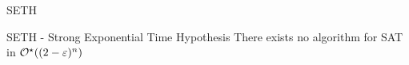 \begin{frame}{SETH}
    \begin{alertblock}{SETH - Strong Exponential Time Hypothesis}
        There exists no algorithm for SAT in $\mathcal{O}^\star((2-\varepsilon)^n)$
    \end{alertblock}
\end{frame}